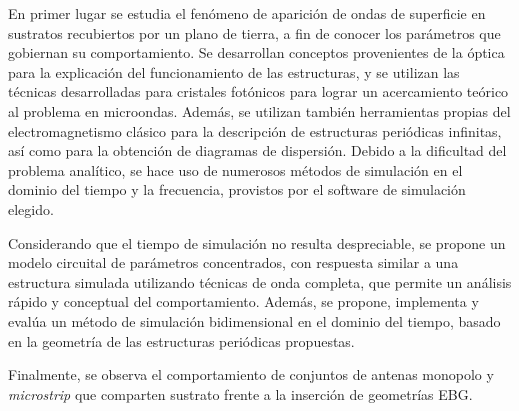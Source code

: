 \documentclass[a4paper, 11pt, twoside]{Thesis}  %
\begin{document}
En primer lugar se estudia el fenómeno de aparición de ondas de superficie en sustratos recubiertos por un plano de tierra, a fin de conocer los parámetros que gobiernan su comportamiento. Se desarrollan conceptos provenientes de la óptica para la explicación del funcionamiento de las estructuras, y se utilizan las técnicas desarrolladas para cristales fotónicos para lograr un acercamiento teórico al problema en microondas. Además, se utilizan también herramientas propias del electromagnetismo clásico para la descripción de estructuras periódicas infinitas, así como para la obtención de diagramas de dispersión. Debido a la dificultad del problema analítico, se hace uso de numerosos métodos de simulación en el dominio del tiempo y la frecuencia, provistos por el software de simulación elegido.

Considerando que el tiempo de simulación no resulta despreciable, se propone un modelo circuital de parámetros concentrados, con respuesta similar a una estructura simulada utilizando técnicas de onda completa, que permite un análisis rápido y conceptual del comportamiento. Además, se propone, implementa y evalúa un método de simulación bidimensional en el dominio del tiempo, basado en la geometría de las estructuras periódicas propuestas.

Finalmente, se observa el comportamiento de conjuntos de antenas monopolo y \textit{microstrip} que comparten sustrato frente a la inserción de geometrías EBG.

\clearpage








\pagestyle{empty}

\begin{center}
\bigskip
\end{center}

\clearpage


\end{document}
